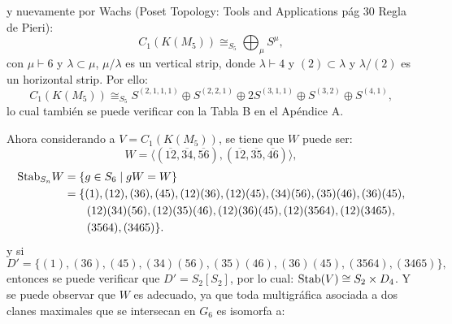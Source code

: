 \documentclass[12pt]{book}
\theoremstyle{definition}
\newcounter{in}
\begin{document}
y nuevamente por Wachs (Poset Topology: Tools and Applications pág 30 Regla de Pieri):
\begin{equation}
C_{1}(K(M_{5})) \cong_{S_{5}} \bigoplus_{\mu} S^{\mu}, 
\end{equation}
con $\mu \vdash 6$ y $\lambda \subset \mu$, $\mu / \lambda$ es un vertical strip, donde $\lambda \vdash 4$ y $(2) \subset \lambda$ y $\lambda / (2)$ es un horizontal strip. Por ello:
\begin{equation*}
C_{1}(K(M_{5})) \cong_{S_{5}} S^{(2,1,1,1)} \oplus S^{(2,2,1)} \oplus 2S^{(3,1,1)} \oplus S^{(3,2)} \oplus S^{(4,1)},
\end{equation*}
lo cual también se puede verificar con la Tabla B en el Apéndice A.

Ahora considerando a $V = C_{1}(K(M_5))$, se tiene que $W$ puede ser:
$$W = \langle(\overline{12},\overline{34},\overline{56}),(\overline{12},\overline{35},\overline{46})\rangle,$$
  \begin{equation*}
    \begin{aligned}
      \textup{Stab}_{S_{n}} W &=\{g\in S_{6}\mid gW=W\}\\
      &=\{(1),(12),(36),(45),(12)(36),(12)(45),(34)(56),(35)(46),(36)(45),\\
      &\qquad{}(12)(34)(56),(12)(35)(46),(12)(36)(45),(12)(3564),(12)(3465), \\
      &\qquad{}(3564),(3465)\}.
    \end{aligned}
\end{equation*}
y si
\begin{equation*}
      D' =\{(1),(36),(45),(34)(56),(35)(46),(36)(45),(3564),(3465)\},
\end{equation*}
entonces se puede verificar que $D' = S_{2} \left [ S_{2} \right ]$, por lo cual: $\textup{Stab}(V) \cong S_{2} \times D_{4}$.
Y se puede observar que $W$ es adecuado, ya que toda multigráfica asociada a dos clanes maximales que se intersecan en $G_{6}$ es isomorfa a:
\end{document}
